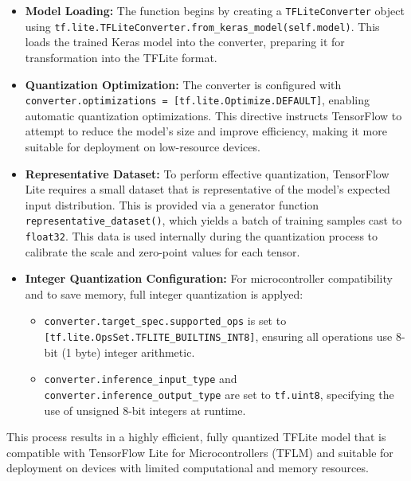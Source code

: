 \begin{itemize}
    \item \textbf{Model Loading:} The function begins by creating a \texttt{TFLiteConverter} object using \texttt{tf.lite.TFLiteConverter.from\_keras\_model(self.model)}. This loads the trained Keras model into the converter, preparing it for transformation into the TFLite format.

    \item \textbf{Quantization Optimization:} 
    The converter is configured with \texttt{converter.optimizations = [tf.lite.Optimize.DEFAULT]}, enabling automatic quantization optimizations. This directive instructs TensorFlow to attempt to reduce the model’s size and improve efficiency, making it more suitable for deployment on low-resource devices.\cite{tensorflow_quantization}

    \item \textbf{Representative Dataset:} 
    To perform effective quantization, TensorFlow Lite requires a small dataset that is representative of the model’s expected input distribution. This is provided via a generator function \texttt{representative\_dataset()}, which yields a batch of training samples cast to \texttt{float32}. This data is used internally during the quantization process to calibrate the scale and zero-point values for each tensor. \cite{tensorflow_quantization} \cite{tensorflow_representativedataset}

    \item \textbf{Integer Quantization Configuration:}
    For microcontroller compatibility and to save memory, full integer quantization is applyed:
    \begin{itemize}
        \item \texttt{converter.target\_spec.supported\_ops} is set to
        \newline
        \texttt{[tf.lite.OpsSet.TFLITE\_BUILTINS\_INT8]},
        \newline
         ensuring all operations use 8-bit (1 byte) integer arithmetic.
        \item \texttt{converter.inference\_input\_type} and \texttt{converter.inference\_output\_type} are set to \texttt{tf.uint8}, specifying the use of unsigned 8-bit integers at runtime.
    \end{itemize}

\end{itemize}

This process results in a highly efficient, fully quantized TFLite model that is compatible with TensorFlow Lite for Microcontrollers (TFLM) and suitable for deployment on devices with limited computational and memory resources. \cite{jacob2018quantization}







